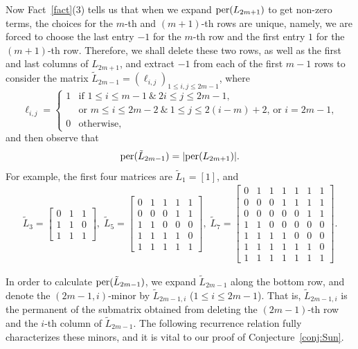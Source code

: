\documentclass[11pt,reqno]{amsart}
\numberwithin{equation}{section}
\theoremstyle{plain}
\theoremstyle{definition}
\def\per{\mathrm{per}}
\def\per{{\rm per}}
\begin{document}
Now Fact~\ref{fact}(3) tells us that when we expand $\per(L_{2m+1})$ to get non-zero terms, the choices for the $m$-th and $(m+1)$-th rows are unique, namely, we are forced to choose the last entry $-1$ for the $m$-th row and the first entry $1$ for the $(m+1)$-th row. Therefore, we shall delete these two rows, as well as the first and last columns of $L_{2m+1}$, and extract $-1$ from each of the first $m-1$ rows to consider the matrix
$\tilde{L}_{2m-1}=(\ell_{i,j})_{1\le i,j\le 2m-1}$, where
$$\ell_{i,j}=\begin{cases}
1 & \text{if $1\le i\le m-1\ \&\ 2i\le j\le 2m-1$,}\\
 & \text{or $m\le i\le 2m-2\ \&\ 1\le j\le 2(i-m)+2$, or $i=2m-1$,}\\
0 & \text{otherwise,}
\end{cases}$$
and then observe that
\begin{align}
\label{id:pertildeA=perA}
\per(\tilde{L}_{2m-1})=|\per(L_{2m+1})|.
\end{align}
For example, the first four matrices are $\tilde{L}_1=[1]$, and
\begin{align*}
\tilde{L}_3=\begin{bmatrix}
0 & 1 & 1 \\
1 & 1 & 0 \\
1 & 1 & 1
\end{bmatrix},
\;
\tilde{L}_5=\begin{bmatrix}
0 & 1 & 1 & 1 & 1\\
0 & 0 & 0 & 1 & 1\\
1 & 1 & 0 & 0 & 0\\
1 & 1 & 1 & 1 & 0\\
1 & 1 & 1 & 1 & 1
\end{bmatrix},
\;
\tilde{L}_7=\begin{bmatrix}
0 & 1 & 1 & 1 & 1 & 1 & 1\\
0 & 0 & 0 & 1 & 1 & 1 & 1\\
0 & 0 & 0 & 0 & 0 & 1 & 1\\
1 & 1 & 0 & 0 & 0 & 0 & 0\\
1 & 1 & 1 & 1 & 0 & 0 & 0\\
1 & 1 & 1 & 1 & 1 & 1 & 0\\
1 & 1 & 1 & 1 & 1 & 1 & 1
\end{bmatrix}.
\end{align*}

In order to calculate $\per(\tilde{L}_{2m-1})$, we expand $\tilde{L}_{2m-1}$ along the bottom row, and denote the $(2m-1,i)$-minor by $\tilde{L}_{2m-1,i}$ ($1\le i\le 2m-1$). That is,  $\tilde{L}_{2m-1,i}$ is the permanent of the submatrix obtained from deleting the $(2m-1)$-th row and the $i$-th column of $\tilde{L}_{2m-1}$. The following recurrence relation fully characterizes these minors, and it is vital to our proof of Conjecture~\ref{conj:Sun}.
\end{document}
